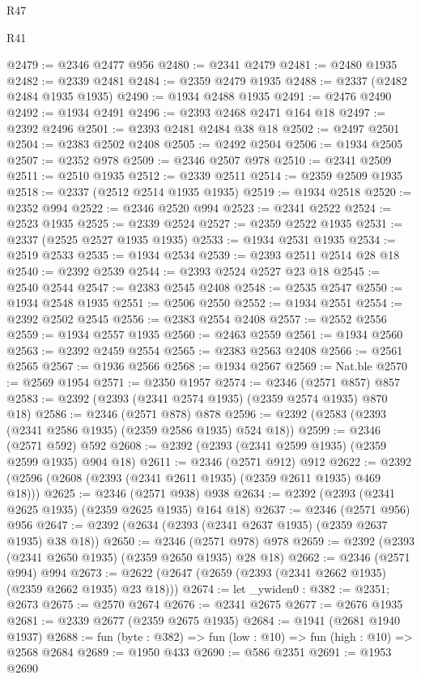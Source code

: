 \begin{lexlean}{R47}
\begin{lexlean}{R41}
\begin{coremodule}
{{{{{{{{{{{{{{{{{{{{{{{{{{{{{{{{{{{{{{{{{{{{{{{{{{{{{{{{{{{{{{{{{{{{{{{{{{{{{{{{{{{{{{{@2479 := @2346 @2477 @956
@2480 := @2341 @2479
@2481 := @2480 @1935
@2482 := @2339 @2481
@2484 := @2359 @2479 @1935
@2488 := @2337 (@2482 @2484 @1935 @1935)
@2490 := @1934 @2488 @1935
@2491 := @2476 @2490
@2492 := @1934 @2491
@2496 := @2393 @2468 @2471 @164 @18
@2497 := @2392 @2496
@2501 := @2393 @2481 @2484 @38 @18
@2502 := @2497 @2501
@2504 := @2383 @2502 @2408
@2505 := @2492 @2504
@2506 := @1934 @2505
@2507 := @2352 @978
@2509 := @2346 @2507 @978
@2510 := @2341 @2509
@2511 := @2510 @1935
@2512 := @2339 @2511
@2514 := @2359 @2509 @1935
@2518 := @2337 (@2512 @2514 @1935 @1935)
@2519 := @1934 @2518
@2520 := @2352 @994
@2522 := @2346 @2520 @994
@2523 := @2341 @2522
@2524 := @2523 @1935
@2525 := @2339 @2524
@2527 := @2359 @2522 @1935
@2531 := @2337 (@2525 @2527 @1935 @1935)
@2533 := @1934 @2531 @1935
@2534 := @2519 @2533
@2535 := @1934 @2534
@2539 := @2393 @2511 @2514 @28 @18
@2540 := @2392 @2539
@2544 := @2393 @2524 @2527 @23 @18
@2545 := @2540 @2544
@2547 := @2383 @2545 @2408
@2548 := @2535 @2547
@2550 := @1934 @2548 @1935
@2551 := @2506 @2550
@2552 := @1934 @2551
@2554 := @2392 @2502 @2545
@2556 := @2383 @2554 @2408
@2557 := @2552 @2556
@2559 := @1934 @2557 @1935
@2560 := @2463 @2559
@2561 := @1934 @2560
@2563 := @2392 @2459 @2554
@2565 := @2383 @2563 @2408
@2566 := @2561 @2565
@2567 := @1936 @2566
@2568 := @1934 @2567
@2569 := Nat.ble
@2570 := @2569 @1954
@2571 := @2350 @1957
@2574 := @2346 (@2571 @857) @857
@2583 := @2392 (@2393 (@2341 @2574 @1935) (@2359 @2574 @1935) @870 @18)
@2586 := @2346 (@2571 @878) @878
@2596 := @2392 (@2583 (@2393 (@2341 @2586 @1935) (@2359 @2586 @1935) @524 @18))
@2599 := @2346 (@2571 @592) @592
@2608 := @2392 (@2393 (@2341 @2599 @1935) (@2359 @2599 @1935) @904 @18)
@2611 := @2346 (@2571 @912) @912
@2622 := @2392 (@2596 (@2608 (@2393 (@2341 @2611 @1935) (@2359 @2611 @1935) @469 @18)))
@2625 := @2346 (@2571 @938) @938
@2634 := @2392 (@2393 (@2341 @2625 @1935) (@2359 @2625 @1935) @164 @18)
@2637 := @2346 (@2571 @956) @956
@2647 := @2392 (@2634 (@2393 (@2341 @2637 @1935) (@2359 @2637 @1935) @38 @18))
@2650 := @2346 (@2571 @978) @978
@2659 := @2392 (@2393 (@2341 @2650 @1935) (@2359 @2650 @1935) @28 @18)
@2662 := @2346 (@2571 @994) @994
@2673 := @2622 (@2647 (@2659 (@2393 (@2341 @2662 @1935) (@2359 @2662 @1935) @23 @18)))
@2674 := let _ywiden0 : @382 := @2351; @2673
@2675 := @2570 @2674
@2676 := @2341 @2675
@2677 := @2676 @1935
@2681 := @2339 @2677 (@2359 @2675 @1935)
@2684 := @1941 (@2681 @1940 @1937)
@2688 := fun (byte : @382) => fun (low : @10) => fun (high : @10) => @2568 @2684
@2689 := @1950 @433
@2690 := @586 @2351
@2691 := @1953 @2690
}}}}}}}}}}}}}}}}}}}}}}}}}}}}}}}}}}}}}}}}}}}}}}}}}}}}}}}}}}}}}}}}}}}}}}}}}}}}}}}}}}}}}}}
\end{coremodule}
\end{lexlean}
\end{lexlean}
